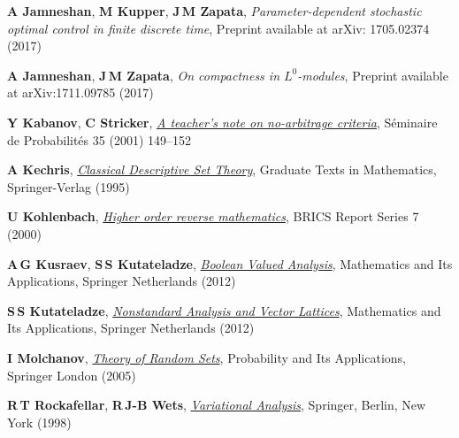 \documentclass{jloganal}
\numberwithin{equation}{section}
\theoremstyle{plain}
\begin{document}
\begin{thebibliography}{}
\textbf{A Jamneshan}, \textbf{M Kupper}, \textbf{J\,M Zapata},
  \emph{{Parameter-dependent stochastic optimal control in finite discrete
  time}}, Preprint available at arXiv: 1705.02374  (2017)

\textbf{A Jamneshan}, \textbf{J\,M Zapata}, \emph{{On compactness in
  $L^0$-modules}}, Preprint available at arXiv:1711.09785  (2017)

\textbf{Y Kabanov}, \textbf{C Stricker},
  \href{http://dx.doi.org/10.1007/b76885} {\emph{{A teacher's note on
  no-arbitrage criteria}}}, S\'eminaire de Probabilit\'es 35 (2001) 149--152

\textbf{A Kechris}, \href{http://dx.doi.org/10.1007/978-1-4612-4190-4}
  {\emph{Classical Descriptive Set Theory}}, Graduate Texts in Mathematics,
  Springer-Verlag (1995)

\textbf{U Kohlenbach}, \href{http://dx.doi.org/10.7146/brics.v7i49.20216}
  {\emph{Higher order reverse mathematics}}, BRICS Report Series 7 (2000)

\textbf{A\,G Kusraev}, \textbf{S\,S Kutateladze},
  \href{http://dx.doi.org/10.13140/RG.2.1.2164.6486} {\emph{Boolean Valued
  Analysis}}, Mathematics and Its Applications, Springer Netherlands (2012)

\textbf{S\,S Kutateladze}, \href{http://dx.doi.org/10.1007/978-94-011-4305-9}
  {\emph{Nonstandard Analysis and Vector Lattices}}, Mathematics and Its
  Applications, Springer Netherlands (2012)


\textbf{I Molchanov}, \href{http://dx.doi.org/10.1007/1-84628-150-4}
  {\emph{Theory of Random Sets}}, Probability and Its Applications, Springer
  London (2005)

\textbf{R\,T Rockafellar}, \textbf{R\,J-B Wets},
  \href{http://dx.doi.org/10.1007/978-3-642-02431-3} {\emph{{Variational
  Analysis}}}, Springer, Berlin, New York (1998)



\end{thebibliography}
\end{document}
